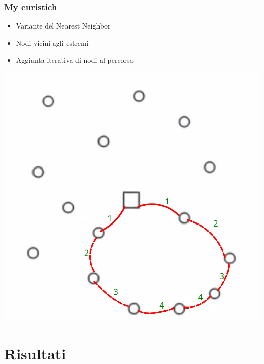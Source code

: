\documentclass[compress]{beamer}
\begin{document}
\subsubsection{My euristich}
\begin{frame}{\subsubsecname}
    
    \begin{minipage}{0.49\textwidth}
        \begin{itemize}
        \item Variante del Nearest Neighbor
        \item Nodi vicini agli estremi
        \item Aggiunta iterativa di nodi al percorso
    \end{itemize}
    \end{minipage}
    \begin{minipage}{0.49\textwidth}
        \centering
        \includegraphics[width=0.8\linewidth]{images/my_euristich.png}
    \end{minipage}
\end{frame}

\section{Risultati}
\end{document}

